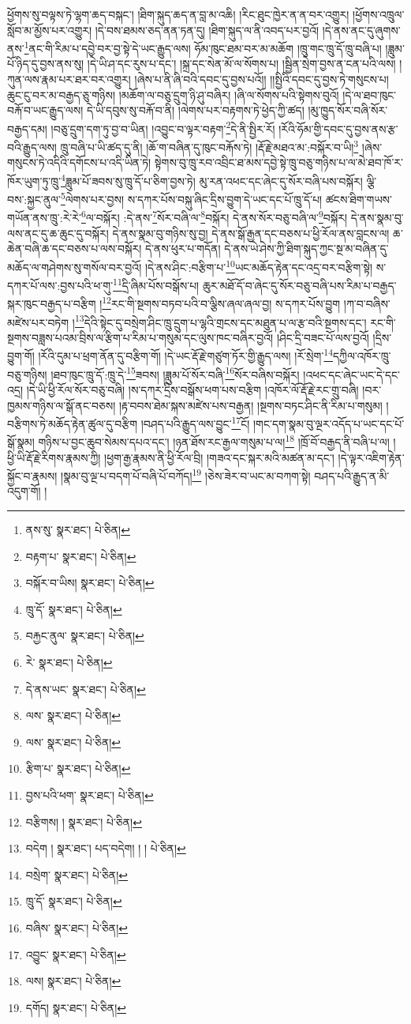 ཕྱོགས་སུ་བལྟས་ཏེ་ལྷག་ཆད་བསྐང་། །ཐིག་སྐུད་ཆད་ན་བླ་མ་འཆི། །རིང་ཐུང་ཁྱེར་ན་ན་བར་འགྱུར། །ཕྱོགས་འཁྲུལ་སློབ་མ་མྱོས་པར་འགྱུར། །དེ་བས་ཐམས་ཅད་ནན་ཏན་དུ། །ཐིག་སྐུད་ལ་ནི་འབད་པར་བྱའོ། །དེ་ནས་ནང་དུ་ཞུགས་ནས་\footnote{ནས་སུ་  སྣར་ཐང་།  པེ་ཅིན། }ནང་གི་རིམ་པ་དབྱེ་བར་བྱ་སྟེ་དེ་ཡང་རྒྱུད་ལས། ཧོམ་ཁུང་ཐམ་བར་མ་མཆོག །ཁྲུ་གང་ཁྲུ་དོ་ཁྲུ་བཞི་པ། །ཟླུམ་པོ་ཉིད་དུ་བྱས་ནས་སུ། །དེ་ཡི་ཤ་དང་རུས་པ་དང་། །སྐྲ་དང་སེན་མོ་ལ་སོགས་པ། །སྦྱིན་སྲེག་བྱས་ན་ངན་པའི་ལས། །ཀུན་ལས་རྣམ་པར་ཐར་བར་འགྱུར། །ཞེས་པ་ནི་ཞི་བའི་དབང་དུ་བྱས་པའོ།། །།སྤྱིའི་དབང་དུ་བྱས་ཏེ་གསུངས་པ། ཆུང་ངུ་བར་མ་བརྒྱད་ཅུ་གཉིས། །མཆོག་ལ་བཅུ་དྲུག་ཉི་ཤུ་བཞིར། །ཞི་ལ་སོགས་པའི་སྟེགས་བུའོ། །དེ་ལ་ཐབ་ཁུང་བརྐོ་བ་ཡང་རྒྱུད་ལས། དེ་ཡི་དབུས་སུ་བརྐོ་བ་ནི། །ལེགས་པར་བརྟགས་ཏེ་ཕྱེད་ཀྱི་ཚད། །མུ་ཁྱུད་སོར་བཞི་སོར་བརྒྱད་དམ། །བཅུ་དྲུག་དག་ཏུ་བྱ་བ་ཡིན། །འབྱུང་བ་ལྟར་བརྟག་\footnote{བརྟག་པ་  སྣར་ཐང་།  པེ་ཅིན། }དེ་ནི་སྤྱིར་རོ། །རོའི་ཧོམ་གྱི་དབང་དུ་བྱས་ནས་རྩ་བའི་རྒྱུད་ལས། ཁྲུ་བཞི་པ་ཡི་ཚད་དུ་ནི། །ཆོ་ག་བཞིན་དུ་ཁུང་བརྐོས་ཏེ། །རྡོ་རྗེ་མཐའ་མ་:བསྐོར་བ་ཡི།\footnote{བསྐོར་བ་ཡིས།  སྣར་ཐང་།  པེ་ཅིན། } །ཞེས་གསུངས་ཏེ་འདིའི་དགོངས་པ་འདི་ཡིན་ཏེ། སྟེགས་བུ་ཁྲུ་རབ་འབྲིང་ཐ་མས་དབྱེ་སྟེ་ཁྲུ་བཅུ་གཉིས་པ་ལ་མེ་ཐབ་ཁོ་ར་ཁོར་ཡུག་ཏུ་ཁྲུ་\footnote{ཁྲུ་དོ་  སྣར་ཐང་།  པེ་ཅིན། }ཟླུམ་པོ་ཟབས་སུ་ཁྲུ་དོ་པ་ཅིག་བྱས་ཏེ། མུ་རན་འཕང་དང་ཞེང་དུ་སོར་བཞི་པས་བསྐོར། ལྕི་བས་:སྐྱང་ནུལ་\footnote{བརྐྱང་ནུལ་  སྣར་ཐང་།  པེ་ཅིན། }ལེགས་པར་བྱས། ས་དཀར་པོས་བསྐུ་ཞིང་དྲིས་བྱུག་དེ་ཡང་དང་པོ་ཁྲུ་དོ་པ། ཚངས་ཐིག་གཡས་གཡོན་ནས་ཁྲུ་:རེ་རེ་\footnote{རེ་  སྣར་ཐང་།  པེ་ཅིན། }ལ་བསྐོར། :དེ་ནས་\footnote{དེ་ནས་ཡང་  སྣར་ཐང་།  པེ་ཅིན། }སོར་བཞི་ལ་\footnote{ལས་  སྣར་ཐང་།  པེ་ཅིན། }བསྐོར། དེ་ནས་སོར་བཅུ་བཞི་ལ་\footnote{ལས་  སྣར་ཐང་།  པེ་ཅིན། }བསྐོར། དེ་ནས་སྣམ་བུ་ལས་ནང་དུ་ཆ་ཆུང་དུ་བསྐོར། དེ་ནས་སྣམ་བུ་གཉིས་སུ་བྱ། དེ་ནས་སྒོ་རྒྱན་དང་བཅས་པ་ཕྱི་རོལ་ནས་བླངས་ལ། ཆ་ཆེན་བཞི་ཆ་དང་བཅས་པ་ལས་བསྐོར། དེ་ནས་ཕུར་པ་གདོན། དེ་ནས་ཡེ་ཤེས་ཀྱི་ཐིག་སྐུད་ཀྱང་སྔ་མ་བཞིན་དུ་མཆོད་ལ་གཤེགས་སུ་གསོལ་བར་བྱའོ། །དེ་ནས་ཤིང་:བརྩིག་པ་\footnote{རྩིག་པ་  སྣར་ཐང་།  པེ་ཅིན། }ཡང་མཆོད་རྟེན་དང་འདྲ་བར་བརྩིག་སྟེ། ས་དཀར་པོ་ལས་:བྱས་པའི་ཕ་གུ་\footnote{བྱས་པའི་ཕག་  སྣར་ཐང་།  པེ་ཅིན། }དྲི་ཞིམ་པོས་བསྒོས་པ། ཆུར་མཐོ་དོ་བ་ཞེང་དུ་སོར་བཅུ་བཞི་པས་རིམ་པ་བརྒྱད་སྐར་ཁུང་བརྒྱད་པ་བརྩིག །\footnote{བརྩིགས། །  སྣར་ཐང་།  པེ་ཅིན། }རང་གི་སྔགས་བཏབ་པའི་བ་ལྕིས་ཞལ་ཞལ་བྱ། ས་དཀར་པོས་བྱུག །ཀ་བ་བཞིས་མཛེས་པར་བཏེག །\footnote{བདེག །  སྣར་ཐང་། པད་བདེག། ། །  པེ་ཅིན། }དེའི་སྟེང་དུ་བསྲེག་ཤིང་ཁྲུ་དྲུག་པ་ལྷའི་གྲངས་དང་མཐུན་པ་ལ་རྩ་བའི་སྔགས་དང་། རང་གི་སྔགས་བཟླས་པའམ་བྲིས་ལ་རྩིག་པ་རིམ་པ་གསུམ་དང་ལུས་ཁང་བཞིར་བྱའོ། །ཤིང་དྲི་བཟང་པོ་ལས་བྱའོ། །དྲིས་བྱུག་གོ། །རོའི་དུམ་པ་ཕྲག་ནོན་དུ་བརྩིག་གོ། །དེ་ཡང་རྡོ་རྗེ་གཙུག་ཏོར་གྱི་རྒྱུད་ལས། །རོ་སྲེག་\footnote{བསྲེག་  སྣར་ཐང་།  པེ་ཅིན། }དཀྱིལ་འཁོར་ཁྲུ་བཅུ་གཉིས། །ཐབ་ཁུང་ཁྲུ་དོ་:ཁྲུ་དེ་\footnote{ཁྲུ་དོ་  སྣར་ཐང་།  པེ་ཅིན། }ཟབས། །ཟླུམ་པོ་སོར་བཞི་\footnote{བཞིས་  སྣར་ཐང་།  པེ་ཅིན། }སོར་བཞིས་བསྐོར། །འཕང་དང་ཞེང་ཡང་དེ་དང་འདྲ། །དེ་ཡི་ཕྱི་རོལ་སོར་བཅུ་བཞི། །ས་དཀར་དྲིས་བསྒོས་ཕག་པས་བརྩིག །འཁོར་ལོ་རྡོ་རྗེ་རང་གྲུ་བཞི། །བར་ཁྱམས་གཉིས་ལ་སྒོ་ནང་བཅས། །རྟ་བབས་ཐེམ་སྐས་མཛེས་པས་བརྒྱན། །སྔགས་བཏང་ཤིང་ནི་རིམ་པ་གསུམ། །བརྩིགས་ཏེ་མཆོད་རྟེན་ཚུལ་དུ་བརྩིག །བཤད་པའི་རྒྱུད་ལས་བྱུང་\footnote{འབྱུང་  སྣར་ཐང་།  པེ་ཅིན། }ངོ། །གང་དག་སྣམ་བུ་ལྔར་འདོད་པ་ཡང་དང་པོ་སྒོ་སྣམ། གཉིས་པ་བྱང་ཆུབ་སེམས་དཔའ་དང་། །ཉན་ཐོས་རང་རྒྱལ་གསུམ་པ་ལ།\footnote{ལས།  སྣར་ཐང་།  པེ་ཅིན། } །ཁྲོ་བོ་བརྒྱད་ནི་བཞི་པ་ལ། །ཕྱི་ཡི་རྡོ་རྗེ་རིགས་རྣམས་ཀྱི། །ཕྱག་རྒྱ་རྣམས་ནི་ཕྱི་རོལ་བྲི། །གཟའ་དང་སྐར་མའི་མཚན་མ་དང་། །དེ་ལྟར་འཇིག་རྟེན་སྐྱོང་བ་རྣམས། །སྣམ་བུ་ལྔ་པ་བདག་པོ་བཞི་པོ་བཀོད།\footnote{དགོད།  སྣར་ཐང་།  པེ་ཅིན། } །ཅེས་ཟེར་བ་ཡང་མ་བཀག་སྟེ། བཤད་པའི་རྒྱུད་ན་མི་འདུག་གོ། །
